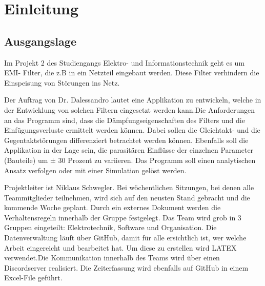 \section{Einleitung}
\subsection{Ausgangslage}
Im Projekt 2 des Studiengangs Elektro- und Informationstechnik geht es um EMI- Filter, die z.B in ein Netzteil eingebaut werden. Diese Filter verhindern die Einspeisung von Störungen ins Netz.

Der Auftrag von Dr. Dalessandro lautet eine Applikation zu entwickeln, welche in der Entwicklung von solchen Filtern eingesetzt werden kann.Die Anforderungen an das Programm sind, dass die Dämpfungseigenschaften des Filters und die Einfügungsverluste ermittelt werden können. Dabei sollen die Gleichtakt- und die Gegentaktstörungen differenziert betrachtet werden können. Ebenfalls soll die Applikation in der Lage sein, die parasitären Einflüsse der einzelnen Parameter (Bauteile) um ± 30 Prozent zu variieren. Das Programm soll einen analytischen Ansatz verfolgen oder mit einer Simulation gelöst werden.
 
Projektleiter ist Niklaus Schwegler. Bei wöchentlichen Sitzungen, bei denen alle Teammitglieder teilnehmen, wird sich auf den neusten Stand gebracht und die kommende Woche geplant. Durch ein externes Dokument werden die Verhaltensregeln innerhalb der Gruppe festgelegt. Das Team wird grob in 3 Gruppen eingeteilt: Elektrotechnik, Software und Organisation.  Die Datenverwaltung läuft über GitHub, damit für alle ersichtlich ist, wer welche Arbeit eingereicht und bearbeitet hat. Um diese zu erstellen wird LATEX verwendet.Die Kommunikation innerhalb des Teams wird über einen Discordserver realisiert.  Die Zeiterfassung wird ebenfalls auf GitHub in einem Excel-File geführt.
    







